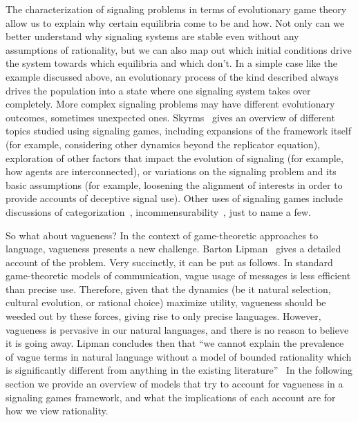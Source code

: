 \documentclass[a4paper]{article}
\begin{document}
The characterization of signaling problems in terms of evolutionary game theory allow us to explain why certain equilibria come to be and how.
Not only can we better understand why signaling systems are stable even without any assumptions of rationality, but we can also map out which initial conditions drive the system towards which equilibria and which don't.
In a simple case like the example discussed above, an evolutionary process of the kind described always drives the population into a state where one signaling system takes over completely. %
More complex signaling problems may have different evolutionary outcomes, sometimes unexpected ones.
Skyrms~\parencite*{skyrms_signals_2010} gives an overview of different topics studied using signaling games, including expansions of the framework itself (for example, considering other dynamics beyond the replicator equation), exploration of other factors that impact the evolution of signaling (for example, how agents are interconnected), or variations on the signaling problem and its basic assumptions (for example, loosening the alignment of interests in order to provide accounts of deceptive signal use).
Other uses of signaling games include discussions of categorization~\parencite[\emph{e.g.}][]{jager_language_2007}, incommensurability~\parencite[\emph{e.g.}][]{barrett_faithful_2010}, just to name a few.

So what about vagueness?
In the context of game-theoretic approaches to language, vagueness presents a new challenge.
Barton Lipman~\parencite*{lipman_why_2009} gives a detailed account of the problem.
Very succinctly, it can be put as follows.
In standard game-theoretic models of communication, vague usage of messages is less efficient than precise use.
Therefore, given that the dynamics (be it natural selection, cultural evolution, or rational choice) maximize utility, vagueness should be weeded out by these forces, giving rise to only precise languages.
However, vagueness is pervasive in our natural languages, and there is no reason to believe it is going away.
Lipman concludes then that ``we cannot explain the prevalence of vague terms in natural language without a model of bounded rationality which is significantly different from anything in the existing literature''~\parencite*[1]{lipman_why_2009}
In the following section we provide an overview of models that try to account for vagueness in a signaling games framework, and what the implications of each account are for how we view rationality.
\end{document}
